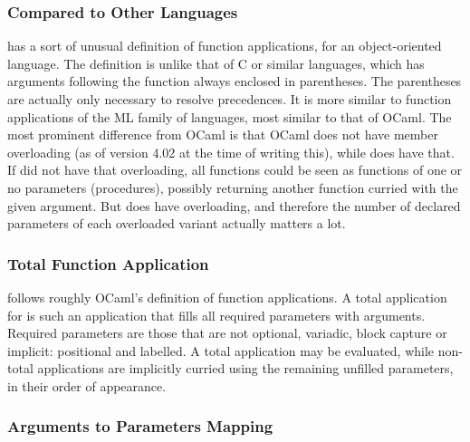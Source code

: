 \subsubsection{Compared to Other Languages}

\Aml has a sort of unusual definition of function applications, for an object-oriented language. The definition is unlike that of C or similar languages, which has arguments following the function always enclosed in parentheses. The parentheses are actually only necessary to resolve precedences. It is more similar to function applications of the ML family of languages, most similar to that of OCaml. The most prominent difference from OCaml is that OCaml does not have member overloading (as of version 4.02 at the time of writing this), while \Aml does have that. If \Aml did not have that overloading, all functions could be seen as functions of one or no parameters (procedures), possibly returning another function curried with the given argument. But \Aml does have overloading, and therefore the number of declared parameters of each overloaded variant actually matters a lot. 





\subsubsection{Total Function Application}

\Aml follows roughly OCaml's definition of function applications. A total application for \Aml is such an application that fills all required parameters with arguments. Required parameters are those that are not optional, variadic, block capture or implicit: positional and labelled. A total application may be evaluated, while non-total applications are implicitly curried using the remaining unfilled parameters, in their order of appearance. 







\subsubsection{Arguments to Parameters Mapping}

